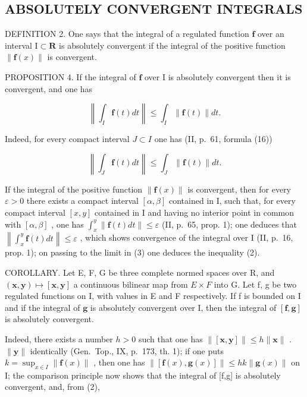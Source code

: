 \subsection{ABSOLUTELY CONVERGENT INTEGRALS}

DEFINITION 2. One says that the integral of a regulated function \(\mathbf{f}\) over an interval \(\mathrm{I} \subset \mathbf{R}\) is absolutely convergent if the integral of the positive function \(\| \mathbf{f}(x) \|\) is convergent.

PROPOSITION 4. If the integral of \(\mathbf{f}\) over \(\mathrm{I}\) is absolutely convergent then it is convergent, and one has

\[
\left\| \int_ {I} \mathbf {f} (t) d t \right\| \leqslant \int_ {I} \| \mathbf {f} (t) \| d t.\tag{2}
\]

Indeed, for every compact interval \(J \subset I\) one has (II, p.~61, formula (16))

\[
\left\| \int_ {J} \mathbf {f} (t) d t \right\| \leqslant \int_ {J} \| \mathbf {f} (t) \| d t.\tag{3}
\]

If the integral of the positive function \(\|\mathbf{f}(x)\|\) is convergent, then for every \(\varepsilon > 0\) there exists a compact interval \([\alpha, \beta]\) contained in I, such that, for every compact interval \([x, y]\) contained in I and having no interior point in common with \([\alpha, \beta]\) , one has \(\int_{x}^{y} \|\mathbf{f}(t) dt\| \leqslant \varepsilon\) (II, p.~65, prop. 1); one deduces that \(\left\|\int_{x}^{y} \mathbf{f}(t) dt\right\| \leqslant \varepsilon\) , which shows convergence of the integral over I (II, p.~16, prop. 1); on passing to the limit in (3) one deduces the inequality (2).

COROLLARY. Let E, F, G be three complete normed spaces over R, and \((\mathbf{x}, \mathbf{y}) \mapsto [\mathbf{x}, \mathbf{y}]\) a continuous bilinear map from \(E \times F\) into G. Let f, g be two regulated functions on I, with values in E and F respectively. If f is bounded on I and if the integral of \(\mathbf{g}\) is absolutely convergent over I, then the integral of \([\mathbf{f},\mathbf{g}]\) is absolutely convergent.

Indeed, there exists a number \(h > 0\) such that one has \(\| [\mathbf{x},\mathbf{y}] \| \leqslant h \| \mathbf{x} \|\) . \(\| \mathbf{y} \|\) identically (Gen.~Top., IX, p.~173, th. 1); if one puts \(k = \sup_{x \in I} \| \mathbf{f}(x) \|\) , then one has \(\| [\mathbf{f}(x),\mathbf{g}(x)] \| \leqslant hk \| \mathbf{g}(x) \|\) on I; the comparison principle now shows that the integral of {[}f,g{]} is absolutely convergent, and, from (2),

